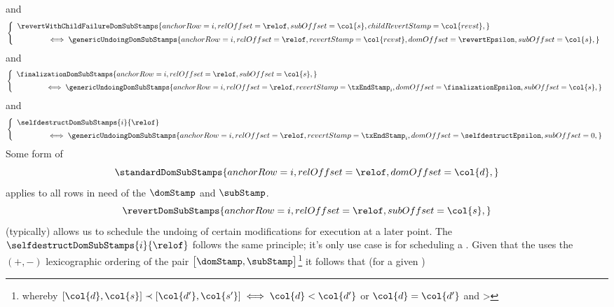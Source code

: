 and
\[
	\left\{ \begin{array}{l}
		\revertWithChildFailureDomSubStamps {
			anchorRow        = i           ,
			relOffset        = \relof      ,
			subOffset        = \col{s}     ,
			childRevertStamp = \col{revst} ,
		}
		\vspace{2mm} \\ \qquad \qquad \iff
		\genericUndoingDomSubStamps {
			anchorRow   = i              ,
			relOffset   = \relof         ,
			revertStamp = \col{revst}    ,
			domOffset   = \revertEpsilon ,
			subOffset   = \col{s}        ,
		}
	\end{array} \right.
\]
and
\[
	\left\{ \begin{array}{l}
		\finalizationDomSubStamps {
			anchorRow = i       ,
			relOffset = \relof  ,
			subOffset = \col{s} ,
		}
		\vspace{2mm} \\ \qquad \qquad \iff
		\genericUndoingDomSubStamps {
			anchorRow   = i                    ,
			relOffset   = \relof               ,
			revertStamp = \txEndStamp_{i}      ,
			domOffset   = \finalizationEpsilon ,
			subOffset   = \col{s}              ,
		}
	\end{array} \right.
\]
and
\[
	\left\{ \begin{array}{l}
		\selfdestructDomSubStamps {i}{\relof}
		\vspace{2mm} \\ \qquad \qquad \iff
		\genericUndoingDomSubStamps {
			anchorRow   = i                    ,
			relOffset   = \relof               ,
			revertStamp = \txEndStamp_{i}      ,
			domOffset   = \selfdestructEpsilon ,
			subOffset   = 0                    ,
		}
	\end{array} \right.
\]
Some form of 
\[ 
	\standardDomSubStamps {
		anchorRow = i       ,
		relOffset = \relof  ,
		domOffset = \col{d} ,
		}
\]
applies to all rows in need of the $\domStamp$ and $\subStamp$.
\[ 
\revertDomSubStamps {
	anchorRow = i       ,
	relOffset = \relof  ,
	subOffset = \col{s} ,
	}
\]
(typically) allows us to schedule the undoing of certain modifications for execution at a later point.
The $\selfdestructDomSubStamps{i}{\relof}$ follows the same principle; it's only use case is for scheduling a . \saNote{} Given that the \zkEvm{} uses the $(+,-)$ lexicographic ordering of the pair $\big[\domStamp, \subStamp\big]$\footnote{whereby $[\col{d}, \col{s}] \prec [\col{d'}, \col{s'}] \iff \col{d} < \col{d'}$ or $\col{d} = \col{d'}$ and  > } it follows that (for a given \hubStamp)
